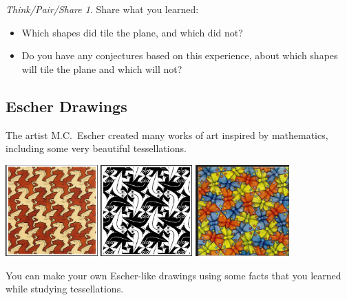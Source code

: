 \documentclass[12pt, reqno]{amsart}
\theoremstyle{remark}
\newtheorem*{thinkpair*}{Think/Pair/Share}
\theoremstyle{definition}
\numberwithin{equation}{section}  %
\begin{document}
\bigskip
\bigskip


\begin{thinkpair*}
Share what you learned: 
\begin{itemize}
\item
Which shapes did tile the plane, and which did not?  \\

\item
Do you have any conjectures based on this experience, about which shapes will tile the plane and which will not?
\end{itemize}
\end{thinkpair*}


\newpage


\subsection{Escher Drawings}
The artist M.C.~Escher created many works of art inspired by mathematics, including some very beautiful tessellations.

\begin{center}
\includegraphics[height=3.5cm]{escher1}
\quad
\includegraphics[height=3.5cm]{escher2}
\quad
\includegraphics[height=3.5cm]{escher4}

\end{center}
You can make your own Escher-like drawings using some facts that you learned while studying tessellations.
\end{document}
